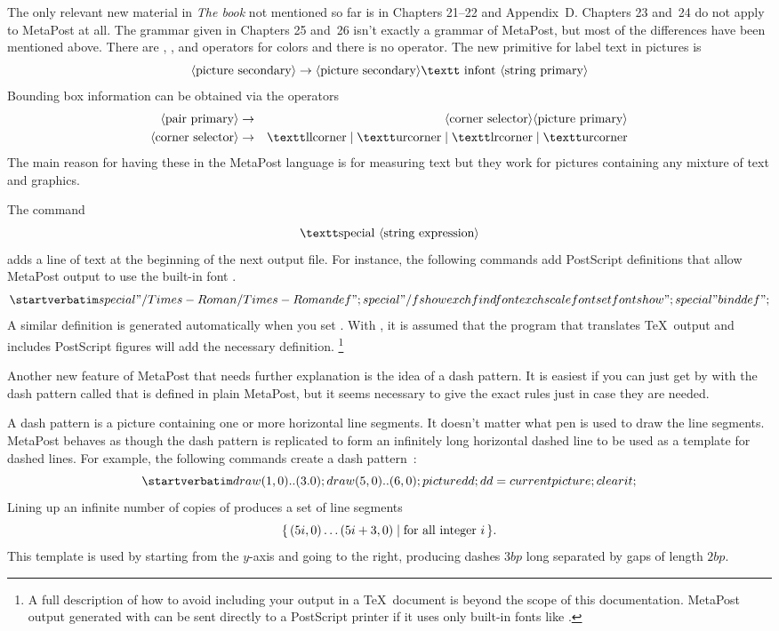 The only relevant new material in {\sl The \MF book\/} not mentioned so far
is in Chapters 21--22 and Appendix~D.  Chapters 23 and~24 do not apply to
MetaPost at all.  The grammar given in Chapters 25 and~26 isn't exactly a
grammar of MetaPost, but most of the differences have been mentioned above.
There are , , and  operators for
colors and there is no  operator.  The new primitive for
label text in pictures is
$$ \descr{picture secondary} \rightarrow
	\descr{picture secondary} \lit{ infont } \descr{string primary}
$$
Bounding box information can be obtained via the operators
\begin{eqnarray*}
  \descr{pair primary} &\rightarrow& \descr{corner selector}
	\descr{picture primary}\\
  \descr{corner selector} &\rightarrow& \lit{llcorner} \mid \lit{urcorner}
	\mid \lit{lrcorner} \mid \lit{urcorner}
\end{eqnarray*}
The main reason for having these in the MetaPost language is for measuring
text but they work for pictures containing any mixture of text and graphics.

The command
$$ \lit{special }\descr{string expression} $$
adds a line of text at the beginning of the next output file.  For instance,
the following commands add PostScript definitions that allow MetaPost output
to use the built-in font .
$$ \startverbatim
special "/Times-Roman /Times-Roman def";
special "/fshow {exch findfont exch scalefont setfont show}";
special " bind def";
$$
A similar definition is generated automatically when you set .
With , it is assumed that the program that translates \TeX\
output and includes PostScript figures will add the necessary definition.%
\footnote{A full description of how to avoid including your
output in a \TeX\ document is beyond the scope of this documentation.
MetaPost output generated with \lit{prologues:=1} can be sent directly to a
PostScript printer if it uses only built-in fonts like \lit{Helvetica}.}

Another new feature of MetaPost that needs further explanation is the idea of
a dash pattern.  It is easiest if you can just get by with the dash pattern
called \lit{evenly} that is defined in plain MetaPost, but it seems necessary
to give the exact rules just in case they are needed.

A dash pattern is a picture containing one or more horizontal
line segments.  It doesn't matter what pen is used to draw the line segments.
MetaPost behaves as though the dash pattern is replicated to form an
infinitely long horizontal dashed line to be used as a template for dashed
lines.  For example, the following commands create a dash pattern~\lit{dd}:
$$\startverbatim
draw (1,0)..(3.0); draw (5,0)..(6,0);
picture dd; dd=currentpicture; clearit;
$$
Lining up an infinite number of copies of  produces a set of line
segments
$$ \{\,(5i,0)\ldots(5i+3,0) \mid \hbox{for all integer $i$}\,\}. $$
This template is used by starting from the $y$-axis and going to the right,
producing dashes $3bp$ long separated by gaps of length $2bp$.


